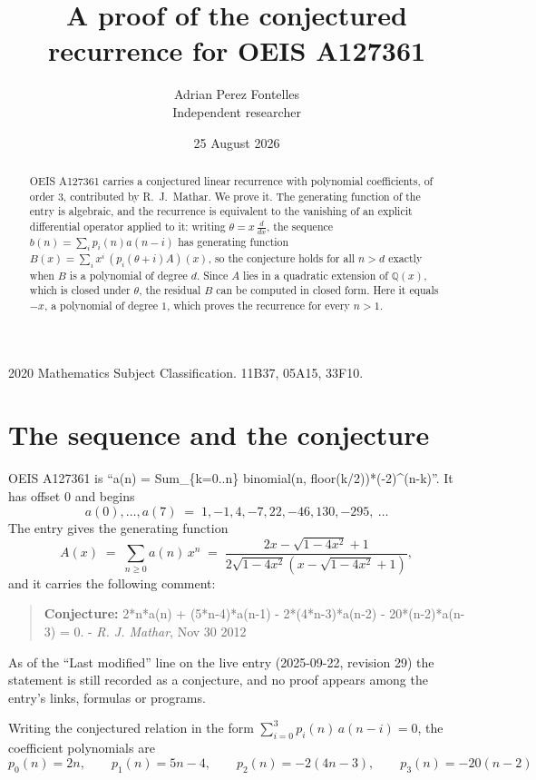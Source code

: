 \documentclass[11pt,a4paper]{article}
\title{A proof of the conjectured recurrence for OEIS A127361}
\author{Adrian Perez Fontelles\\ \small Independent researcher}
\date{25 August 2026}
\theoremstyle{plain}
\theoremstyle{definition}
\begin{document}
\maketitle

\begin{abstract}
OEIS A127361 carries a conjectured linear recurrence with polynomial coefficients, of
order 3, contributed by R.~J.~Mathar. We prove it. The generating function of the
entry is algebraic, and the recurrence is equivalent to the vanishing of an explicit
differential operator applied to it: writing $\theta=x\,\frac{d}{dx}$, the sequence
$b(n)=\sum_{i}p_{i}(n)a(n-i)$ has generating function
$B(x)=\sum_{i}x^{i}\,(p_{i}(\theta+i)A)(x)$, so the conjecture holds for all $n>d$ exactly
when $B$ is a polynomial of degree $d$. Since $A$ lies in a quadratic extension of
$\mathbb{Q}(x)$, which is closed under $\theta$, the residual $B$ can be computed in
closed form. Here it equals $- x$, a polynomial of degree $1$, which proves
the recurrence for every $n>1$.
\end{abstract}

\noindent\small 2020 Mathematics Subject Classification. 11B37, 05A15, 33F10.\normalsize

\section{The sequence and the conjecture}

OEIS A127361 is ``a(n) = Sum\_\{k=0..n\} binomial(n, floor(k/2))*(-2)\^{}(n-k)''. It has offset $0$ and begins
\[
a(0),\dots,a(7)\;=\;1, -1, 4, -7, 22, -46, 130, -295,\ \dots
\]
The entry gives the generating function
\begin{equation}\label{eq:gf}
A(x)\;=\;\sum_{n\ge 0} a(n)\,x^{n}\;=\;\frac{2 x - \sqrt{1 - 4 x^{2}} + 1}{2 \sqrt{1 - 4 x^{2}} \left(x - \sqrt{1 - 4 x^{2}} + 1\right)} ,
\end{equation}
and it carries the following comment:
\begin{quote}\small
\textbf{Conjecture:} 2*n*a(n) + (5*n-4)*a(n-1) - 2*(4*n-3)*a(n-2) - 20*(n-2)*a(n-3) = 0. - \emph{R. J. Mathar}, Nov 30 2012
\end{quote}
As of the ``Last modified'' line on the live entry (2025-09-22, revision 29) the
statement is still recorded as a conjecture, and no proof appears among the entry's links,
formulas or programs.

Writing the conjectured relation in the form $\sum_{i=0}^{3}p_{i}(n)\,a(n-i)=0$,
the coefficient polynomials are
\[
p_{0}(n)=2 n,\qquad p_{1}(n)=5 n - 4,\qquad p_{2}(n)=- 2 \left(4 n - 3\right),\qquad p_{3}(n)=- 20 \left(n - 2\right)
\]
\end{document}
